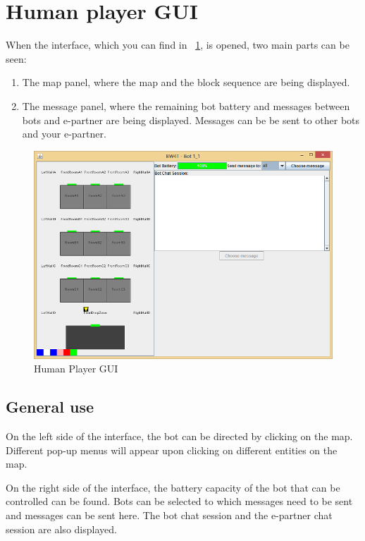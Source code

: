 \section{Human player GUI}
When the interface, which you can find in ~\ref{fig:humanPlayerGUI}, is opened, two main parts can be seen:
\begin{enumerate}
\item The map panel, where the map and the block sequence are being displayed.
\item The message panel, where the remaining bot battery and messages between bots and e-partner are being displayed. Messages can be be sent to other bots and your e-partner.
\end{enumerate}

\begin{figure}[h]
\includegraphics[width = \textwidth]{NewFeatures/hpg.png}
\caption{Human Player GUI}
\label{fig:humanPlayerGUI}
\end{figure}

\subsection{General use}
On the left side of the interface, the bot can be directed by clicking on the map. Different pop-up menus will appear upon clicking on different entities on the map.

On the right side of the interface, the battery capacity of the bot that can be controlled can be found. Bots can be selected to which messages need to be sent and messages can be sent here. The bot chat session and the e-partner chat session are also displayed.

